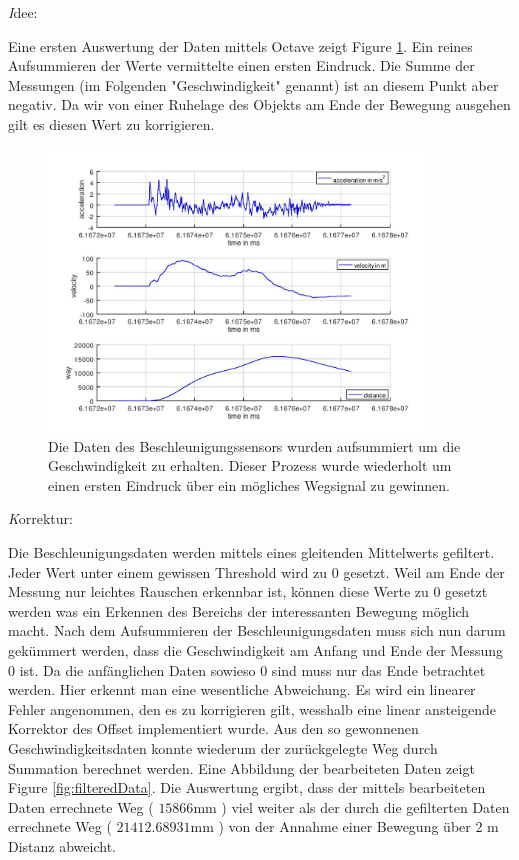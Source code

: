 \documentclass[12pt]{article}
\begin{document}
\textit Idee:

Eine ersten Auswertung der Daten mittels Octave zeigt Figure \ref{fig:plainData}. Ein reines Aufsummieren der Werte vermittelte einen ersten Eindruck.
Die Summe der Messungen (im Folgenden "Geschwindigkeit" genannt) ist an diesem Punkt aber negativ. Da wir von einer Ruhelage des Objekts am Ende der Bewegung ausgehen gilt es diesen Wert zu korrigieren. 

\begin{figure}[H]
	\centering
	\includegraphics[width=10cm]{images/testData.jpg}
	\caption{Die Daten des Beschleunigungssensors wurden aufsummiert um die Geschwindigkeit zu erhalten. Dieser Prozess wurde wiederholt um einen ersten Eindruck über ein mögliches Wegsignal zu gewinnen.}
	\label{fig:plainData}
\end{figure}

\textit Korrektur:

Die Beschleunigungsdaten werden mittels eines gleitenden Mittelwerts gefiltert. Jeder Wert unter einem gewissen Threshold wird zu 0 gesetzt. Weil am Ende der Messung nur leichtes Rauschen erkennbar ist, können diese Werte zu 0 gesetzt werden was ein Erkennen des Bereichs der interessanten Bewegung möglich macht. 
Nach dem Aufsummieren der Beschleunigungsdaten muss sich nun darum gekümmert werden, dass die Geschwindigkeit am Anfang und Ende der Messung 0 ist. Da die anfänglichen Daten sowieso 0 sind muss nur das Ende betrachtet werden. Hier erkennt man eine wesentliche Abweichung. Es wird ein linearer Fehler angenommen, den es zu korrigieren gilt, wesshalb eine linear ansteigende Korrektor des Offset implementiert wurde. 
Aus den so gewonnenen Geschwindigkeitsdaten konnte wiederum der zurückgelegte Weg durch Summation berechnet werden.
Eine Abbildung der bearbeiteten Daten zeigt Figure \ref{fig:filteredData}. Die Auswertung ergibt, dass der mittels bearbeiteten Daten errechnete Weg ( $ 15866$mm ) viel weiter als der durch die gefilterten Daten errechnete Weg ( $21412.68931$mm ) von der Annahme einer Bewegung über $2$ m Distanz abweicht.
\end{document}
